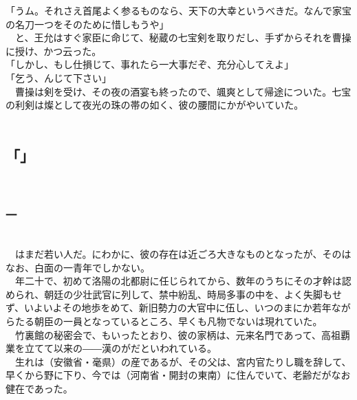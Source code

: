 \documentclass[
  paper=a5,
  fontsize=10pt,
  jafontsize=9.5pt,
  tate,                  %
  open_bracket_pos=nibu, %
]{jlreq}
\begin{document}
「うム。それさえ首尾よく参るものなら、天下の大幸というべきだ。なんで家宝の名刀一つをそのために惜しもうや」\\


　と、王允はすぐ家臣に命じて、秘蔵の七宝剣を取りだし、手ずからそれを曹操に授け、かつ云った。\\


「しかし、もし仕損じて、事れたら一大事だぞ、充分心してえよ」\\


「乞う、んじて下さい」\\


　曹操は剣を受け、その夜の酒宴も終ったので、颯爽として帰途についた。七宝の利剣は燦として夜光の珠の帯の如く、彼の腰間にかがやいていた。\\

\\

\subsection{「」}

\\

\subsubsection{一}

\\


　はまだ若い人だ。にわかに、彼の存在は近ごろ大きなものとなったが、そのはなお、白面の一青年でしかない。\\


　年二十で、初めて洛陽の北都尉に任じられてから、数年のうちにその才幹は認められ、朝廷の少壮武官に列して、禁中紛乱、時局多事の中を、よく失脚もせず、いよいよその地歩をめて、新旧勢力の大官中に伍し、いつのまにか若年ながらたる朝臣の一員となっているところ、早くも凡物でないは現れていた。\\


　竹裏館の秘密会で、もいったとおり、彼の家柄は、元来名門であって、高祖覇業を立てて以来の――漢のがだといわれている。\\


　生れは（安徽省・毫県）の産であるが、その父は、宮内官たりし職を辞して、早くから野に下り、今では（河南省・開封の東南）に住んでいて、老齢だがなお健在であった。\\
\end{document}
